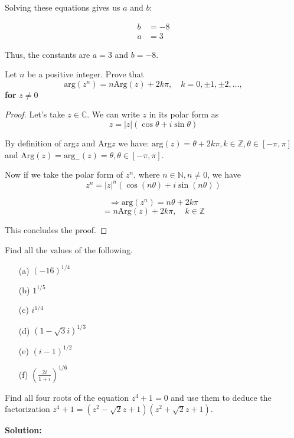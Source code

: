 \documentclass[
	12pt, %
	fleqn, %
	a4paper, %
]{LegrandOrangeBook}
\begin{document}
Solving these equations gives us \( a \) and \( b \):

\begin{align*}
b &= -8 \\
a &= 3
\end{align*}

Thus, the constants are \( a = 3 \) and \( b = -8 \).

\begin{exercise}
    Let \( n \) be a positive integer. Prove that \[ \text{arg}(z^n) = n \text{Arg}(z) + 2k\pi, \quad k = 0, \pm1, \pm2, \ldots, \]
    \textbf{for} \( z \neq 0 \)
\end{exercise}
\begin{proof}
    Let's take \( z \in \mathbb{C} \). We can write \( z \) in its polar form as
\[ z = |z|(\cos \theta + i \sin \theta) \]

By definition of arg\( z \) and Arg\( z \) we have: \( \text{arg}(z) = \theta + 2k\pi, k \in \mathbb{Z}, \theta \in [-\pi, \pi] \) and \( \text{Arg}(z) = \text{arg}_{-}(z) = \theta, \theta \in [-\pi, \pi] \).

Now if we take the polar form of \( z^n \), where \( n \in \mathbb{N}, n \neq 0 \), we have
\[ z^n = |z|^n(\cos(n\theta) + i \sin(n\theta)) \]

\[ \Rightarrow \text{arg}(z^n) = n\theta + 2k\pi \]
\[ = n\text{Arg}(z) + 2k\pi, \quad k \in \mathbb{Z} \]

This concludes the proof.
\end{proof}

\begin{exercise}
    Find all the values of the following.
    \begin{enumerate}
        \item[(a)] \( (-16)^{1/4} \)
        \item[(b)] \( 1^{1/5} \)
        \item[(c)] \( i^{1/4} \)
        \item[(d)] \( (1 - \sqrt{3}i)^{1/3} \)
        \item[(e)] \( (i - 1)^{1/2} \)
        \item[(f)] \( \left(\frac{2i}{1+i}\right)^{1/6} \)
    \end{enumerate}
\end{exercise}



\begin{exercise}
    Find all four roots of the equation \( z^4 + 1 = 0 \) and use them to deduce the factorization \( z^4 + 1 = (z^2 - \sqrt{2}z + 1)(z^2 + \sqrt{2}z + 1) \).
\end{exercise}
\textbf{Solution:}
\end{document}
